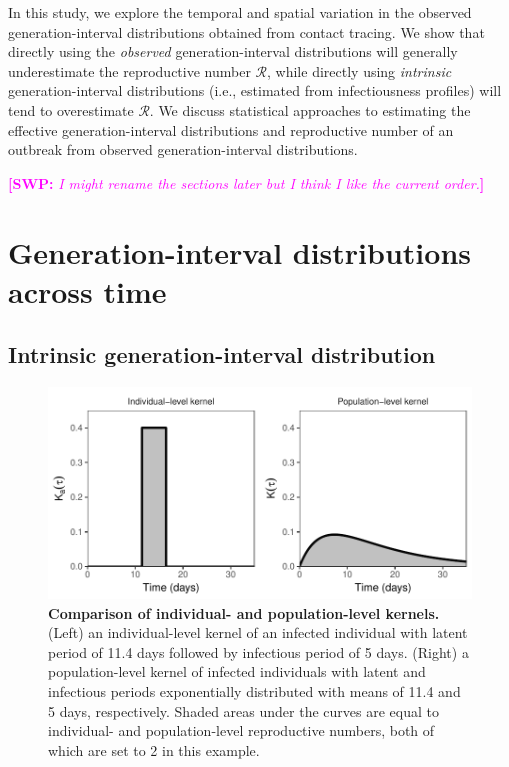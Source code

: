 \documentclass[12pt]{article}
\newcommand{\RR}{\ensuremath{{\mathcal R}}}
\newcommand{\comment}[3]{\textcolor{#1}{\textbf{[#2: }\textsl{#3}\textbf{]}}}
\newcommand{\swp}[1]{\comment{magenta}{SWP}{#1}}
\begin{document}
In this study, we explore the temporal and spatial variation in the observed generation-interval distributions obtained from contact tracing.
We show that directly using the \emph{observed} generation-interval distributions will generally underestimate the reproductive number \RR, while directly using \emph{intrinsic} generation-interval distributions (i.e., estimated from infectiousness profiles) will tend to overestimate \RR.
We discuss statistical approaches to estimating the effective generation-interval distributions and reproductive number of an outbreak from observed generation-interval distributions.

\swp{I might rename the sections later but I think I like the current order.}
\section{Generation-interval distributions across time}

\subsection{Intrinsic generation-interval distribution}

\begin{figure}[t]
\includegraphics[width=\textwidth]{../fig/individual_and_population.pdf}
\caption{\textbf{Comparison of individual- and population-level kernels.}
(Left) an individual-level kernel of an infected individual with latent period of 11.4 days followed by infectious period of 5 days. 
(Right) a population-level kernel of infected individuals with latent and infectious periods exponentially distributed with means of 11.4 and 5 days, respectively. 
Shaded areas under the curves are equal to individual- and population-level reproductive numbers, both of which are set to 2 in this example.
}
\label{fig:indpop}

\end{figure}
\end{document}
